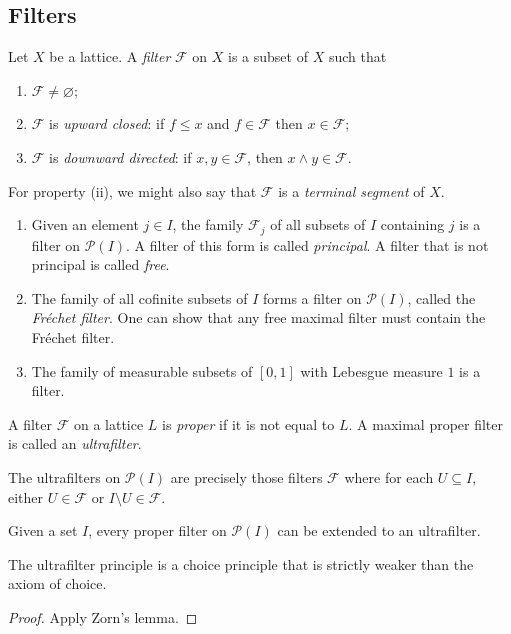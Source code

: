 \subsection{Filters}
\begin{definition}
    Let \( X \) be a lattice.
    A \emph{filter} \( \mathcal F \) on \( X \) is a subset of \( X \) such that
    \begin{enumerate}
        \item \( \mathcal F \neq \varnothing \);
        \item \( \mathcal F \) is \emph{upward closed}: if \( f \leq x \) and \( f \in \mathcal F \) then \( x \in \mathcal F \);
        \item \( \mathcal F \) is \emph{downward directed}: if \( x, y \in \mathcal F \), then \( x \wedge y \in \mathcal F \).
    \end{enumerate}
\end{definition}
For property (ii), we might also say that \( \mathcal F \) is a \emph{terminal segment} of \( X \).
\begin{example}
    \begin{enumerate}
        \item Given an element \( j \in I \), the family \( \mathcal F_j \) of all subsets of \( I \) containing \( j \) is a filter on \( \mathcal P(I) \).
        A filter of this form is called \emph{principal}.
        A filter that is not principal is called \emph{free}.
        \item The family of all cofinite subsets of \( I \) forms a filter on \( \mathcal P(I) \), called the \emph{Fr\'echet filter}.
        One can show that any free maximal filter must contain the Fr\'echet filter.
        \item The family of measurable subsets of \( [0,1] \) with Lebesgue measure \( 1 \) is a filter.
    \end{enumerate}
\end{example}
\begin{definition}
    A filter \( \mathcal F \) on a lattice \( L \) is \emph{proper} if it is not equal to \( L \).
    A maximal proper filter is called an \emph{ultrafilter}.
\end{definition}
The ultrafilters on \( \mathcal P(I) \) are precisely those filters \( \mathcal F \) where for each \( U \subseteq I \), either \( U \in \mathcal F \) or \( I \setminus U \in \mathcal F \).
\begin{proposition}
    Given a set \( I \), every proper filter on \( \mathcal P(I) \) can be extended to an ultrafilter.
\end{proposition}
The ultrafilter principle is a choice principle that is strictly weaker than the axiom of choice.
\begin{proof}
    Apply Zorn's lemma.
\end{proof}

